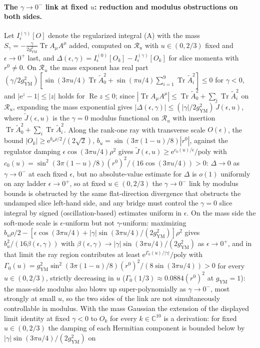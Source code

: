 \paragraph{The \(\gamma\to0^{-}\) link at fixed \(u\): reduction and modulus obstructions on both sides.} Let \(I_\epsilon^{(\gamma)}[O]\) denote the regularized integral (A) with the mass \(S_\gamma=-\tfrac{\gamma}{2g_{\mathrm{YM}}^2}\operatorname{Tr}A_\mu A^\mu\) added, computed on \(\mathcal R_u\) with \(u\in(0,2/3)\) fixed and \(\epsilon\to0^+\) last, and \(\Delta(\epsilon,\gamma)=I_\epsilon^{(0)}[O_k]-I_\epsilon^{(\gamma)}[O_k]\) for slice momenta with \(r^0\ne0\). On \(\mathcal R_u\) the mass exponent has real part \((\gamma/2g_{\mathrm{YM}}^2)[\sin(3\pi u/4)\operatorname{Tr}\tilde A_0^2+\sin(\pi u/4)\sum_{i=1}^{9}\operatorname{Tr}\tilde A_i^2]\le0\) for \(\gamma<0\), and \(|\mathrm e^{z}-1|\le|z|\) holds for \(\operatorname{Re}z\le0\); since \(|\operatorname{Tr}A_\mu A^\mu|\le\operatorname{Tr}\tilde A_0^2+\sum_i\operatorname{Tr}\tilde A_i^2\) on \(\mathcal R_u\), expanding the mass exponential gives \(|\Delta(\epsilon,\gamma)|\le(|\gamma|/2g_{\mathrm{YM}}^2)\,\tilde J(\epsilon,u)\), where \(\tilde J(\epsilon,u)\) is the \(\gamma=0\) modulus functional on \(\mathcal R_u\) with insertion \(\operatorname{Tr}\tilde A_0^2+\sum_i\operatorname{Tr}\tilde A_i^2\). Along the rank-one ray with transverse scale \(O(\epsilon)\), the bound \(|O_k|\ge\mathrm e^{b_u\rho/2}/(2\sqrt2)\), \(b_u=\sin(3\pi(1-u)/8)|r^0|\), against the regulator damping \(\epsilon\cos(3\pi u/4)\rho^2\) gives \(\tilde J(\epsilon,u)\ge\mathrm e^{c_0(u)/\epsilon}/\mathrm{poly}\) with \(c_0(u)=\sin^2(3\pi(1-u)/8){(r^0)}^2/(16\cos(3\pi u/4))>0\): \(\Delta\to0\) as \(\gamma\to0^-\) at each fixed \(\epsilon\), but no absolute-value estimate for \(\Delta\) is \(o(1)\) uniformly on any ladder \(\epsilon\to0^+\), so at fixed \(u\in(0,2/3)\) the \(\gamma\to0^{-}\) link by modulus bounds is obstructed by the same flat-direction divergence that obstructs the undamped slice left-hand side, and any bridge must control the \(\gamma=0\) slice integral by signed (oscillation-based) estimates uniform in \(\epsilon\). On the mass side the soft-mode scale is \(\epsilon\)-uniform but not \(\gamma\)-uniform: maximizing \(b_u\rho/2-[\epsilon\cos(3\pi u/4)+|\gamma|\sin(3\pi u/4)/(2g_{\mathrm{YM}}^2)]\rho^2\) gives \(b_u^2/(16\beta(\epsilon,\gamma))\) with \(\beta(\epsilon,\gamma)\to|\gamma|\sin(3\pi u/4)/(2g_{\mathrm{YM}}^2)\) as \(\epsilon\to0^+\), and in that limit the ray region contributes at least \(\mathrm e^{\Gamma_0(u)/|\gamma|}/\mathrm{poly}\) with \(\Gamma_0(u)=g_{\mathrm{YM}}^2\sin^2(3\pi(1-u)/8){(r^0)}^2/(8\sin(3\pi u/4))>0\) for every \(u\in(0,2/3)\), strictly decreasing in \(u\) (\(\Gamma_0(1/3)\approx0.0884{(r^0)}^2\) at \(g_{\mathrm{YM}}=1\)): the mass-side modulus also blows up super-polynomially as \(\gamma\to0^-\), most strongly at small \(u\), so the two sides of the link are not simultaneously controllable in modulus. With the mass Gaussian the extension of the displayed limit identity at fixed \(\gamma<0\) to \(O_k\) for every \(k\in\mathbb C^{10}\) is a derivation: for fixed \(u\in(0,2/3)\) the damping of each Hermitian component is bounded below by \(|\gamma|\sin(3\pi u/4)/(2g_{\mathrm{YM}}^2)\) on 